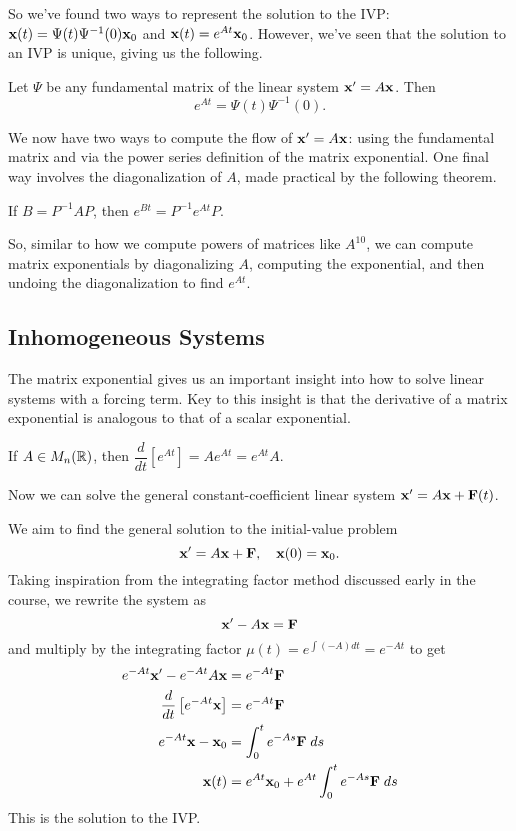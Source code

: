 \documentclass[../m082main.tex]{subfiles}
\begin{document}
So we've found two ways to represent the solution to the IVP: $\mathbf{x}(t) = \Psi(t) \Psi^{-1}(0)\mathbf{x}_0$ and $\mathbf{x}(t) = e^{At} \mathbf{x}_0$.
However, we've seen that the solution to an IVP is unique, giving us the following.

\begin{theorem}[Characterization of $e^{At}$]
    Let $\Psi$ be any fundamental matrix of the linear system $\mathbf{x}' = A\mathbf{x}$.
    Then
    \[ e^{At} = \Psi (t) \Psi^{-1} (0). \]
\end{theorem}

We now have two ways to compute the flow of $\mathbf{x}' = A \mathbf{x}$: using the fundamental matrix and via the power series definition of the matrix exponential.
One final way involves the diagonalization of $A$, made practical by the following theorem.

\begin{theorem}
    If $B = P^{-1} A P$, then $e^{Bt} = P^{-1} e^{At} P$.
\end{theorem}

So, similar to how we compute powers of matrices like $A^{10}$, we can compute matrix exponentials by diagonalizing $A$, computing the exponential, and then undoing the diagonalization to find $e^{At}$.

\subsection{Inhomogeneous Systems}
The matrix exponential gives us an important insight into how to solve linear systems with a forcing term.
Key to this insight is that the derivative of a matrix exponential is analogous to that of a scalar exponential.

\begin{lemma}
    If $A \in M_n (\mathbb{R})$, then $\dfrac{d}{dt} \left[ e^{At} \right] = A e^{At} = e^{At} A$.
\end{lemma}

Now we can solve the general constant-coefficient linear system $\mathbf{x}' = A \mathbf{x} + \mathbf{F}(t)$.

\begin{example}
    We aim to find the general solution to the initial-value problem
    \[ \mathbf{x}' = A \mathbf{x} + \mathbf{F}, \quad \mathbf{x}(0) = \mathbf{x}_0. \]
    Taking inspiration from the integrating factor method discussed early in the course, we rewrite the system as
    \[ \mathbf{x}' - A \mathbf{x} = \mathbf{F} \]
    and multiply by the integrating factor $\mu(t) = e^{\int (-A) dt} = e^{-A t}$ to get
    \begin{align*}
        e^{-At} \mathbf{x}' - e^{-At} A \mathbf{x} &= e^{-At} \mathbf{F} \\
        \frac{d}{dt} \left[ e^{-At} \mathbf{x} \right] &= e^{-At} \mathbf{F} \\
        e^{-At}\mathbf{x} - \mathbf{x}_0 &= \int_{0}^{t} e^{-As} \mathbf{F} \;ds \\
        \mathbf{x}(t) &= e^{At} \mathbf{x}_0 + e^{At} \int_0^t e^{-As} \mathbf{F} \;ds
    \end{align*}
    This is the solution to the IVP.
\end{example}
\end{document}
